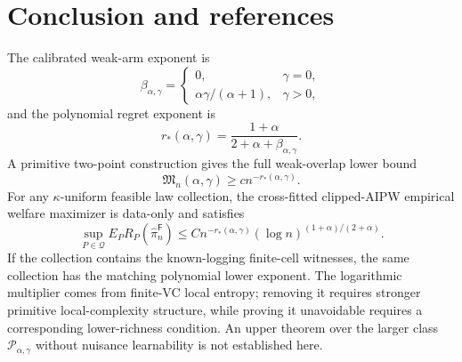 \documentclass[11pt]{article}
\theoremstyle{definition}
\theoremstyle{plain}
\theoremstyle{remark}
\begin{document}
\section{Conclusion and references}
The calibrated weak-arm exponent is
\[
\beta_{\alpha,\gamma}=
\begin{cases}
0,&\gamma=0,\\
\alpha\gamma/(\alpha+1),&\gamma>0,
\end{cases}
\]
and the polynomial regret exponent is
\[
r_*(\alpha,\gamma)=
\frac{1+\alpha}{2+\alpha+\beta_{\alpha,\gamma}}.
\]
A primitive two-point construction gives the full weak-overlap lower bound
\[
\mathfrak M_n(\alpha,\gamma)\ge c n^{-r_*(\alpha,\gamma)}.
\]
For any \(\kappa\)-uniform feasible law collection, the cross-fitted
clipped-AIPW empirical welfare maximizer is data-only and satisfies
\[
\sup_{P\in\mathcal Q}
E_P R_P(\widehat\pi_n^{\mathsf F})
\le
C n^{-r_*(\alpha,\gamma)}(\log n)^{(1+\alpha)/(2+\alpha)}.
\]
If the collection contains the known-logging finite-cell witnesses, the same
collection has the matching polynomial lower exponent.  The logarithmic
multiplier comes from finite-VC local entropy; removing it requires stronger
primitive local-complexity structure, while proving it unavoidable requires
a corresponding lower-richness condition.  An upper theorem over the larger
class \(\mathcal P_{\alpha,\gamma}\) without nuisance learnability is not
established here.
\end{document}

